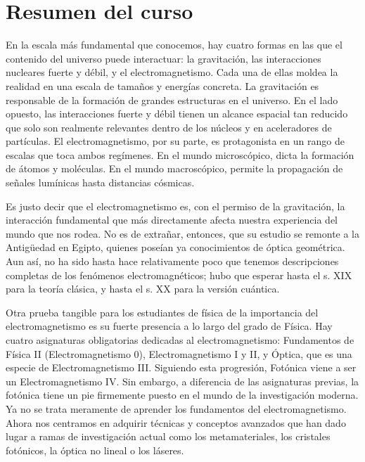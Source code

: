 \section*{Resumen del curso}

En la escala más fundamental que conocemos, hay cuatro formas en las que el contenido del universo puede interactuar: la gravitación, las interacciones nucleares fuerte y débil, y el electromagnetismo. Cada una de ellas moldea la realidad en una escala de tamaños y energías concreta. La gravitación es responsable de la formación de grandes estructuras en el universo. En el lado opuesto, las interacciones fuerte y débil tienen un alcance espacial tan reducido que solo son realmente relevantes dentro de los núcleos y en aceleradores de partículas. El electromagnetismo, por su parte, es protagonista en un rango de escalas que toca ambos regímenes. En el mundo microscópico, dicta la formación de átomos y moléculas. En el mundo macroscópico, permite la propagación de señales lumínicas hasta distancias cósmicas.

Es justo decir que el electromagnetismo es, con el permiso de la gravitación, la interacción fundamental que más directamente afecta nuestra experiencia del mundo que nos rodea. No es de extrañar, entonces, que su estudio se remonte a la Antigüedad en Egipto, quienes poseían ya conocimientos de óptica geométrica. Aun así, no ha sido hasta hace relativamente poco que tenemos descripciones completas de los fenómenos electromagnéticos; hubo que esperar hasta el s. XIX para la teoría clásica, y hasta el s. XX para la versión cuántica. 

Otra prueba tangible para los estudiantes de física de la importancia del electromagnetismo es su fuerte presencia a lo largo del grado de Física. Hay cuatro asignaturas obligatorias dedicadas al electromagnetismo: Fundamentos de Física II (Electromagnetismo 0), Electromagnetismo I y II, y Óptica, que es una especie de Electromagnetismo III. Siguiendo esta progresión, Fotónica viene a ser un Electromagnetismo IV. Sin embargo, a diferencia de las asignaturas previas, la fotónica tiene un pie firmemente puesto en el mundo de la investigación moderna. Ya no se trata meramente de aprender los fundamentos del electromagnetismo. Ahora nos centramos en adquirir técnicas y conceptos avanzados que han dado lugar a ramas de investigación actual como los metamateriales, los cristales fotónicos, la óptica no lineal o los láseres.

